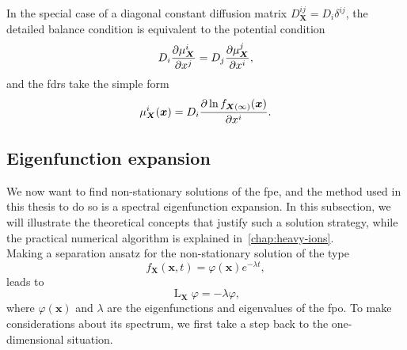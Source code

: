 \documentclass[a4paper,12pt]{book}
\begin{document}
In the special case of a diagonal constant diffusion matrix $D_{\bm{X}}^{ij} = D_i \delta^{ij}$, the detailed balance condition is equivalent to the potential condition
\begin{equation}
    D_i \pdv{\mu_{\bm{X}}^i}{x^j} = D_j \pdv{\mu_{\bm{X}}^j}{x^i},
\end{equation}
and the \acrshort{fdr}s take the simple form
\begin{equation}
\label{eq:fdr_const_diff}
    \mu_{\bm{X}}^i(\bm{x}) = D_i \pdv{\ln f_{\bm{X}(\infty)}(\bm{x})}{x^i}  .
\end{equation}

\subsection{Eigenfunction expansion}\label{subsec:eig_exp}
We now want to find non-stationary solutions of the \acrshort{fpe}, and the method used in this thesis to do so is a spectral eigenfunction expansion. In this subsection, we will illustrate the theoretical concepts that justify such a solution strategy, while the practical numerical algorithm is explained in~\autoref{chap:heavy-ions}.\\  

Making a separation ansatz for the non-stationary solution of the type
\begin{equation}
    f_{\bm{X}}(\bm{x},t) = \varphi(\bm{x}) e^{-\lambda t},
\end{equation}
leads to 
\begin{equation}
     \operatorname{L}_{\bm{X}} \varphi = - \lambda \varphi,
\end{equation}
where $\varphi(\bm{x})$ and $\lambda$ are the eigenfunctions and eigenvalues of the \acrshort{fpo}. To make considerations about its spectrum, we first take a step back to the one-dimensional situation.
\end{document}
